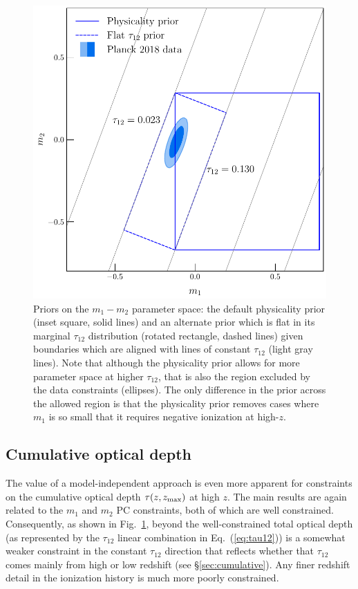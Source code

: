 \documentclass[prd,twocolumn,amsmath,amssymb,floatfix,superscriptaddress,nofootinbib]{revtex4-1}
\newcommand{\zmax}{z_{\rm max}}
\begin{document}
{ \begin{figure}
          \includegraphics[width=0.9\columnwidth]{paper/plots/pl18_pc_zmax30_pliklite_srollv2_1015_plot_rotated_box_flat_tau12.pdf}
          \caption {Priors on the $m_1-m_2$ parameter space: the default physicality prior (inset square, solid lines) and an alternate prior which is  flat in its marginal
           $\tau_{12}$ distribution (rotated rectangle, dashed lines) given boundaries
           which are aligned with lines of constant $\tau_{12}$ (light gray lines). Note that although the physicality prior allows for more parameter space at higher $\tau_{12}$, that is also the region excluded by the data constraints (ellipses). The only difference in the prior across the allowed region is that the physicality prior removes cases where $m_1$ is so small that it requires negative ionization at high-$z$.} 
          \label{fig:prior_box}
\end{figure}


%
%
%
\subsection{Cumulative optical depth}

The value of a model-independent approach is even more apparent for constraints on the
cumulative optical depth $\tau(z, \zmax)$ at high $z$.
The main results are again related to the $m_1$ and $m_2$ PC constraints, both of which are well constrained.  
Consequently, as shown in Fig.~\ref{fig:prior_box}, beyond the well-constrained total optical depth (as represented by the $\tau_{12}$ linear combination in Eq.~(\ref{eq:tau12})) 
is a somewhat weaker constraint in the constant $\tau_{12}$ direction that reflects whether that $\tau_{12}$ comes mainly from high or low redshift (see \S \ref{sec:cumulative}).
Any finer redshift detail in the ionization history is much more poorly constrained.

}
\end{document}
